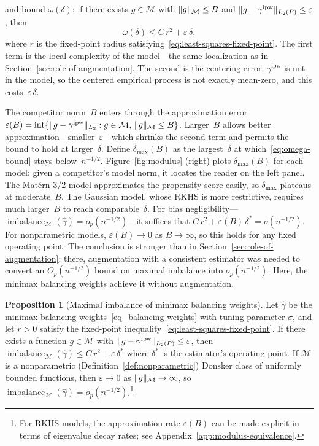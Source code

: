 \documentclass{article}
\DeclarePairedDelimiter\norm{\lVert}{\rVert}
\theoremstyle{definition}
\newtheorem{proposition}[theorem]{Proposition}
\newcommand{\ipw}{\text{ipw}}
\DeclareMathOperator{\imbalance}{imbalance}
\newcommand{\hgamma}{\ensuremath{\hat\gamma}}
\newcommand{\gammaipw}{\ensuremath{\gamma^{\ipw}}}
\newcommand{\model}{\mathcal{M}}
\newcommand{\<}{\langle}
\renewcommand{\>}{\rangle}
\begin{document}
\citet{kong2025asymptotics} and \citet{hirshberg2026bregman} bound $\omega(\delta)$: if there exists $g \in \model$ with $\norm{g}_\model \le B$ and $\norm{g - \gammaipw}_{L_2(P)} \le \varepsilon$, then
\begin{equation}
\label{eq:omega-bound}
\omega(\delta) \le C\,r^2 + \varepsilon\,\delta,
\end{equation}
where $r$ is the fixed-point radius satisfying~\eqref{eq:least-squares-fixed-point}. The first term is the local complexity of the model---the same localization as in Section~\ref{sec:role-of-augmentation}. The second is the centering error: $\gammaipw$ is not in the model, so the centered empirical process is not exactly mean-zero, and this costs~$\varepsilon\,\delta$.

The competitor norm~$B$ enters through the approximation error $\varepsilon(B) = \inf\{\norm{g - \gammaipw}_{L_2} : g \in \model,\, \norm{g}_\model \le B\}$. Larger~$B$ allows better approximation---smaller~$\varepsilon$---which shrinks the second term and permits the bound to hold at larger~$\delta$. Define $\delta_{\max}(B)$ as the largest~$\delta$ at which~\eqref{eq:omega-bound} stays below~$n^{-1/2}$. Figure~\ref{fig:modulus} (right) plots $\delta_{\max}(B)$ for each model: given a competitor's model norm, it locates the reader on the left panel. The Mat\'ern-3/2 model approximates the propensity score easily, so $\delta_{\max}$ plateaus at moderate~$B$. The Gaussian model, whose RKHS is more restrictive, requires much larger~$B$ to reach comparable~$\delta$. For bias negligibility---$\imbalance_\model(\hgamma) = o_p(n^{-1/2})$---it suffices that $C\,r^2 + \varepsilon(B)\,\delta^* = o(n^{-1/2})$. For nonparametric models, $\varepsilon(B) \to 0$ as $B \to \infty$, so this holds for any fixed operating point. The conclusion is stronger than in Section~\ref{sec:role-of-augmentation}: there, augmentation with a consistent estimator was needed to convert an $O_p(n^{-1/2})$ bound on maximal imbalance into $o_p(n^{-1/2})$. Here, the minimax balancing weights achieve it without augmentation.

\begin{proposition}[Maximal imbalance of minimax balancing weights]
\label{prop:bias-balance}
Let $\hgamma$ be the minimax balancing weights~\eqref{eq_balancing-weights} with tuning parameter $\sigma$,
and let $r > 0$ satisfy the fixed-point inequality~\eqref{eq:least-squares-fixed-point}. If there exists a function $g \in \model$ with $\norm{g - \gammaipw}_{L_2(P)} \le \varepsilon$, then $\imbalance_\model(\hgamma) \le C\, r^2 + \varepsilon\,\delta^*$ where $\delta^*$ is the estimator's operating point. If $\model$ is a nonparametric (Definition~\ref{def:nonparametric}) Donsker class of uniformly bounded functions, then $\varepsilon \to 0$ as $\norm{g}_\model \to \infty$, so $\imbalance_\model(\hgamma) = o_p(n^{-1/2})$.\footnote{For RKHS models, the approximation rate $\varepsilon(B)$ can be made explicit in terms of eigenvalue decay rates; see Appendix~\ref{app:modulus-equivalence}.}
\end{proposition}
\end{document}
